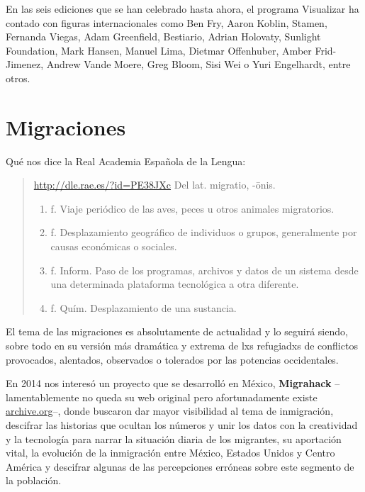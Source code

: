 \documentclass[11pt]{article}
\begin{document}
En las seis ediciones que se han celebrado hasta ahora, el programa Visualizar ha contado con figuras internacionales como Ben Fry, Aaron Koblin, Stamen, Fernanda Viegas, Adam Greenfield, Bestiario, Adrian Holovaty, Sunlight Foundation, Mark Hansen, Manuel Lima, Dietmar Offenhuber, Amber Frid-Jimenez, Andrew Vande Moere, Greg Bloom, Sisi Wei o Yuri Engelhardt, entre otros.


\section*{Migraciones}
\label{sec-3}

Qué nos dice la Real Academia Española de la Lengua:

\begin{quote}
\url{http://dle.rae.es/?id=PE38JXc}
Del lat. migratio, -ōnis.

\begin{enumerate}
\item f. Viaje periódico de las aves, peces u otros animales migratorios.

\item f. Desplazamiento geográfico de individuos o grupos, generalmente por causas económicas o sociales.

\item f. Inform. Paso de los programas, archivos y datos de un sistema desde una determinada plataforma tecnológica a otra diferente.

\item f. Quím. Desplazamiento de una sustancia.
\end{enumerate}
\end{quote}

El tema de las migraciones es absolutamente de actualidad y lo seguirá siendo, sobre todo en su versión más dramática y extrema de lxs refugiadxs de conflictos provocados, alentados, observados o tolerados por las potencias occidentales.

En 2014 nos interesó un proyecto que se desarrolló en México, \textbf{Migrahack} --lamentablemente no queda su web original pero afortunadamente existe \href{https://web-beta.archive.org/web/20150317032615/http://justicejournalism.org/es/events/ciudad-de-mexico-mexico-2014}{archive.org}--, donde buscaron dar mayor visibilidad al tema de inmigración, descifrar las historias que ocultan los números y unir los datos con la creatividad y la tecnología para narrar la situación diaria de los migrantes, su aportación vital, la evolución de la inmigración entre México, Estados Unidos y Centro América y descifrar algunas de las percepciones erróneas sobre este segmento de la población.
\end{document}
